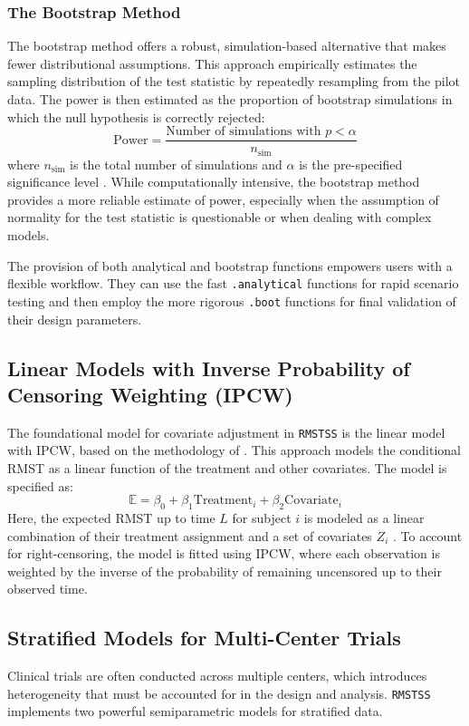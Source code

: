 \documentclass[article]{jss}
\begin{document}
\subsubsection{The Bootstrap Method}
The bootstrap method offers a robust, simulation-based alternative that makes fewer distributional assumptions. This approach empirically estimates the sampling distribution of the test statistic by repeatedly resampling from the pilot data. The power is then estimated as the proportion of bootstrap simulations in which the null hypothesis is correctly rejected:
\begin{equation}
 \text{Power} = \frac{\text{Number of simulations with } p < \alpha}{n_{\text{sim}}}
\end{equation}
where $n_{\text{sim}}$ is the total number of simulations and $\alpha$ is the pre-specified significance level \cite{[1]}. While computationally intensive, the bootstrap method provides a more reliable estimate of power, especially when the assumption of normality for the test statistic is questionable or when dealing with complex models.

The provision of both analytical and bootstrap functions empowers users with a flexible workflow. They can use the fast \texttt{.analytical} functions for rapid scenario testing and then employ the more rigorous \texttt{.boot} functions for final validation of their design parameters.

\subsection{Linear Models with Inverse Probability of Censoring Weighting (IPCW)}
The foundational model for covariate adjustment in \texttt{RMSTSS} is the linear model with IPCW, based on the methodology of \citet{tian2014}. This approach models the conditional RMST as a linear function of the treatment and other covariates. The model is specified as:
\begin{equation}
\mathbb{E} = \beta_0 + \beta_1 \text{Treatment}_i + \beta_2 \text{Covariate}_{i}
\end{equation}
Here, the expected RMST up to time $L$ for subject $i$ is modeled as a linear combination of their treatment assignment and a set of covariates $Z_i$ \cite{[1]}. To account for right-censoring, the model is fitted using IPCW, where each observation is weighted by the inverse of the probability of remaining uncensored up to their observed time.

\subsection{Stratified Models for Multi-Center Trials}
Clinical trials are often conducted across multiple centers, which introduces heterogeneity that must be accounted for in the design and analysis. \texttt{RMSTSS} implements two powerful semiparametric models for stratified data.
\end{document}
